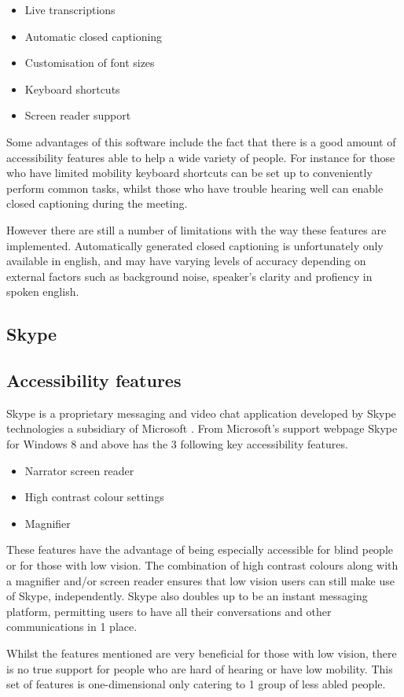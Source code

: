 \begin{itemize}
  \item Live transcriptions
  \item Automatic closed captioning
  \item Customisation of font sizes
  \item Keyboard shortcuts
  \item Screen reader support
\end{itemize}

Some advantages of this software include the fact that there
is a good amount of accessibility features able to help a wide
variety of people. For instance for those who have limited 
mobility keyboard shortcuts can be set up to conveniently 
perform common tasks, whilst those who have trouble hearing
well can enable closed captioning during the meeting.

\vspace{0.2cm}

However there are still a number of limitations with the way 
these features are implemented. Automatically generated 
closed captioning is unfortunately only available in english,
and may have varying levels of accuracy depending on external
factors such as background noise, speaker's clarity and 
profiency in spoken english.

\subsection*{Skype}

\subsection*{Accessibility features}

Skype is a proprietary messaging and video chat application
developed by Skype technologies a subsidiary of Microsoft 
\cite{skype}. From Microsoft's support webpage Skype for 
Windows 8 and above has the 3 following key accessibility 
features.

\begin{itemize}
  \item Narrator screen reader
  \item High contrast colour settings
  \item Magnifier
\end{itemize}

These features have the advantage of being especially 
accessible for blind people or for those with low vision. The 
combination of high contrast colours along with a magnifier 
and/or screen reader ensures that low vision users can still 
make use of Skype, independently. Skype also doubles up to be
an instant messaging platform, permitting users to have all 
their conversations and other communications in 1 place.

\vspace{0.2cm}

Whilst the features mentioned are very beneficial for those 
with low vision, there is no true support for people who are
hard of hearing or have low mobility. This set of features is 
one-dimensional only catering to 1 group of less abled people.
